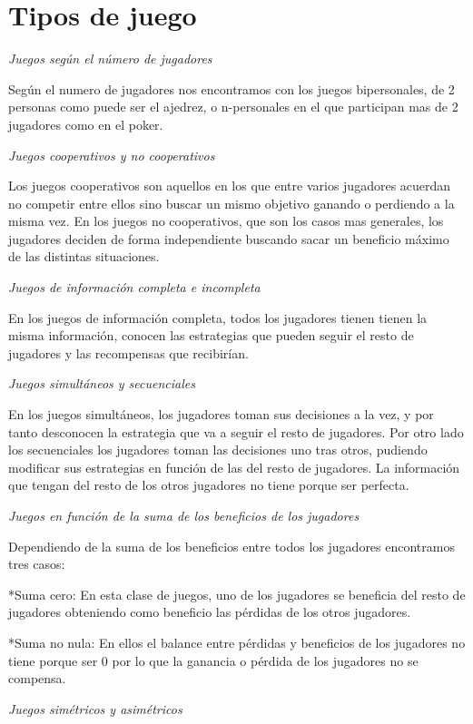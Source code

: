 \documentclass[12pt,a4paper,]{book}
\numberwithin{dummy}{section}
\theoremstyle{ocrenumbox}
\theoremstyle{blacknumex}
\theoremstyle{blacknumbox}
\theoremstyle{ocrenum}
\theoremstyle{ocrenum}
\begin{document}
\hypertarget{Seccion21}{%
\section{Tipos de juego}\label{Seccion21}}

\emph{Juegos según el número de jugadores}

Según el numero de jugadores nos encontramos con los juegos
bipersonales, de 2 personas como puede ser el ajedrez, o n-personales en
el que participan mas de 2 jugadores como en el poker.

\emph{Juegos cooperativos y no cooperativos}

Los juegos cooperativos son aquellos en los que entre varios jugadores
acuerdan no competir entre ellos sino buscar un mismo objetivo ganando o
perdiendo a la misma vez. En los juegos no cooperativos, que son los
casos mas generales, los jugadores deciden de forma independiente
buscando sacar un beneficio máximo de las distintas situaciones.

\emph{Juegos de información completa e incompleta}

En los juegos de información completa, todos los jugadores tienen tienen
la misma información, conocen las estrategias que pueden seguir el resto
de jugadores y las recompensas que recibirían.

\emph{Juegos simultáneos y secuenciales}

En los juegos simultáneos, los jugadores toman sus decisiones a la vez,
y por tanto desconocen la estrategia que va a seguir el resto de
jugadores. Por otro lado los secuenciales los jugadores toman las
decisiones uno tras otros, pudiendo modificar sus estrategias en función
de las del resto de jugadores. La información que tengan del resto de
los otros jugadores no tiene porque ser perfecta.

\emph{Juegos en función de la suma de los beneficios de los jugadores}

Dependiendo de la suma de los beneficios entre todos los jugadores
encontramos tres casos:

*Suma cero: En esta clase de juegos, uno de los jugadores se beneficia
del resto de jugadores obteniendo como beneficio las pérdidas de los
otros jugadores.

*Suma no nula: En ellos el balance entre pérdidas y beneficios de los
jugadores no tiene porque ser 0 por lo que la ganancia o pérdida de los
jugadores no se compensa.

\emph{Juegos simétricos y asimétricos}
\end{document}
